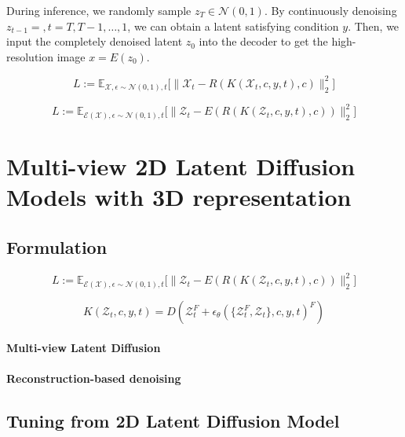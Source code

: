 \documentclass{article}
\theoremstyle{plain}
\theoremstyle{definition}
\theoremstyle{remark}
\begin{document}
During inference, we randomly sample $z_T \in \mathcal{N}(0,1)$. 
%
By continuously denoising $z_{t-1}=, t=T, T-1, \dots, 1$, we can obtain a latent satisfying condition $y$.
%
Then, we input the completely denoised latent $z_0$ into the decoder to get the high-resolution image $x = E(z_0)$.

\begin{equation}
L:=\mathbb{E}_{
\mathcal{X},\epsilon\sim\mathcal{N}(0,1),t}
\Big[\|\mathcal{X}_t - 
R(K(\mathcal{X}_t,c,y,t), c)\|_2^2\Big]
\label{eq.2}
\end{equation}


\begin{equation}
L:=\mathbb{E}_{
\mathcal{E}(\mathcal{X}),\epsilon\sim\mathcal{N}(0,1),t}
\Big[\|\mathcal{Z}_t - 
E(R(K(\mathcal{Z}_t,c,y,t), c))\|_2^2\Big]
\label{eq.2}
\end{equation}

\section{Multi-view 2D Latent Diffusion Models with 3D representation}


\subsection{Formulation}

\begin{equation}
L:=\mathbb{E}_{
\mathcal{E}(\mathcal{X}),\epsilon\sim\mathcal{N}(0,1),t}
\Big[\|\mathcal{Z}_t - 
E(R(K(\mathcal{Z}_t,c,y,t), c))\|_2^2\Big]
\label{eq.2}
\end{equation}


\begin{equation}
K(\mathcal{Z}_t,c,y,t) = D( \mathcal{Z}_{t}^F + \epsilon_\theta(\{\mathcal{Z}_{t}^F, \mathcal{Z}_t\},c,y,t)^F)
\label{eq.2}
\end{equation}

\paragraph{Multi-view Latent Diffusion}

\paragraph{Reconstruction-based denoising}


\subsection{Tuning from 2D Latent Diffusion Model}
\end{document}
